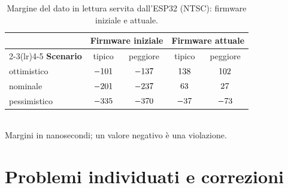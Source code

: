 \documentclass[11pt,a4paper,twoside,openright]{report}
\begin{document}
\begin{table}[htbp]
  \centering
  \caption{Margine del dato in lettura servita dall'ESP32 (NTSC): firmware iniziale e attuale.}
  \label{tab:confronto}
  \begin{tabular}{lcccc}
    \toprule
    & \multicolumn{2}{c}{\textbf{Firmware iniziale}} & \multicolumn{2}{c}{\textbf{Firmware attuale}} \\
    \cmidrule(lr){2-3}\cmidrule(lr){4-5}
    \textbf{Scenario} & tipico & peggiore & tipico & peggiore \\
    \midrule
    ottimistico  & $-101$ & $-137$ & $138$ & $102$ \\
    nominale     & $-201$ & $-237$ & $63$ & $27$ \\
    pessimistico & $-335$ & $-370$ & $-37$ & $-73$ \\
    \bottomrule
  \end{tabular}\\[2pt]
  {\footnotesize Margini in nanosecondi; un valore negativo è una violazione.}
\end{table}

\section{Problemi individuati e correzioni}
\end{document}
